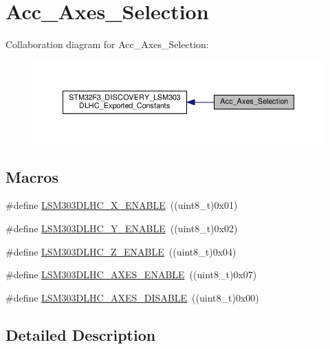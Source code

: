 \hypertarget{group__Acc__Axes__Selection}{\section{Acc\+\_\+\+Axes\+\_\+\+Selection}
\label{group__Acc__Axes__Selection}
}
Collaboration diagram for Acc\+\_\+\+Axes\+\_\+\+Selection\+:\nopagebreak
\begin{figure}[H]
\begin{center}
\leavevmode
\includegraphics[width=350pt]{group__Acc__Axes__Selection}
\end{center}
\end{figure}
\subsection*{Macros}
\begin{DoxyCompactItemize}
\item 
\#define \hyperlink{group__Acc__Axes__Selection_ga25d85207321e759993e9057941e77e15}{L\+S\+M303\+D\+L\+H\+C\+\_\+\+X\+\_\+\+E\+N\+A\+B\+L\+E}~((uint8\+\_\+t)0x01)
\item 
\#define \hyperlink{group__Acc__Axes__Selection_gaf2719fe98a17216284d856880ca54330}{L\+S\+M303\+D\+L\+H\+C\+\_\+\+Y\+\_\+\+E\+N\+A\+B\+L\+E}~((uint8\+\_\+t)0x02)
\item 
\#define \hyperlink{group__Acc__Axes__Selection_gaaefe46a81272686adfe36a40f8235d49}{L\+S\+M303\+D\+L\+H\+C\+\_\+\+Z\+\_\+\+E\+N\+A\+B\+L\+E}~((uint8\+\_\+t)0x04)
\item 
\#define \hyperlink{group__Acc__Axes__Selection_gacd5808a7a7c3d833599e929761a0b74b}{L\+S\+M303\+D\+L\+H\+C\+\_\+\+A\+X\+E\+S\+\_\+\+E\+N\+A\+B\+L\+E}~((uint8\+\_\+t)0x07)
\item 
\#define \hyperlink{group__Acc__Axes__Selection_ga915923af7c67baf113fe7f6486f87faa}{L\+S\+M303\+D\+L\+H\+C\+\_\+\+A\+X\+E\+S\+\_\+\+D\+I\+S\+A\+B\+L\+E}~((uint8\+\_\+t)0x00)
\end{DoxyCompactItemize}


\subsection{Detailed Description}


